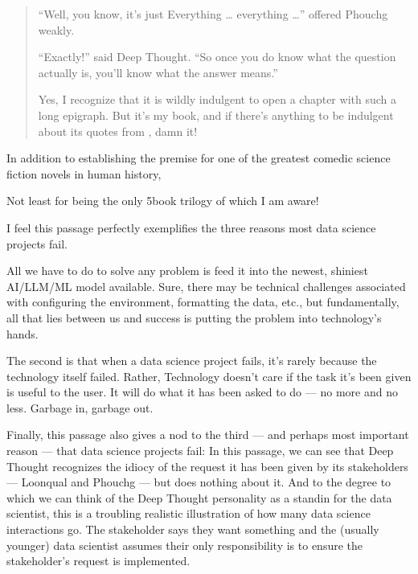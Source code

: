 \documentclass[letterpaper,10pt,english]{jupyterBook}
\begin{document}
\begin{quote}
\sphinxAtStartPar
“Well, you know, it’s just Everything … everything …” offered Phouchg weakly.

\sphinxAtStartPar
“Exactly!” said Deep Thought. “So once you do know what the question actually is, you’ll know what the answer means.”%
\begin{footnote}[1]\sphinxAtStartFootnote
Yes, I recognize that it is wildly indulgent to open a chapter with such a long epigraph. But it’s my book, and if there’s anything to be indulgent about its quotes from , damn it!
%
\end{footnote}
\end{quote}

\sphinxAtStartPar
In addition to establishing the premise for one of the greatest comedic science fiction novels in human history,%
\begin{footnote}[2]\sphinxAtStartFootnote
Not least for being the only 5\sphinxhyphen{}book trilogy of which I am aware!
%
\end{footnote} I feel this passage perfectly exemplifies the three reasons most data science projects fail.

\sphinxAtStartPar
{} All we have to do to solve any problem is feed it into the newest, shiniest AI/LLM/ML model available. Sure, there may be technical challenges associated with configuring the environment, formatting the data, etc., but fundamentally, all that lies between us and success is putting the problem into technology’s hands.

\sphinxAtStartPar
The second is that when a data science project fails, it’s rarely because the technology itself failed. Rather,  Technology doesn’t care if the task it’s been given is useful to the user. It will do what it has been asked to do — no more and no less. Garbage in, garbage out.

\sphinxAtStartPar
Finally, this passage also gives a nod to the third — and perhaps most important reason — that data science projects fail:  In this passage, we can see that Deep Thought recognizes the idiocy of the request it has been given by its stakeholders — Loonqual and Phouchg — but does nothing about it. And to the degree to which we can think of the Deep Thought personality as a stand\sphinxhyphen{}in for the data scientist, this is a troubling realistic illustration of how many data science interactions go. The stakeholder says they want something and the (usually younger) data scientist assumes their only responsibility is to ensure the stakeholder’s request is implemented.
\end{document}
